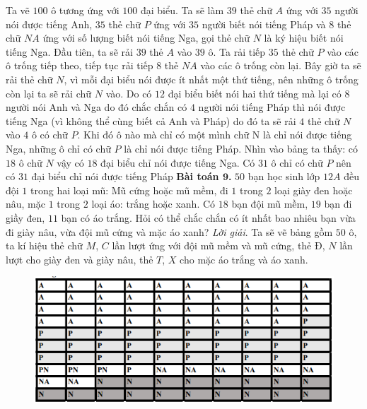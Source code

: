 \begin{multicols}{2}
\begin{figure}[H]
		\vspace*{-15pt}
	\end{figure}
	Ta vẽ $100$ ô tương ứng với $100$ đại biểu. Ta sẽ làm $39$ thẻ chữ $A$ ứng với $35$ người nói được tiếng Anh, $35$ thẻ chữ $P$ ứng với $35$ người biết nói tiếng Pháp và $8$ thẻ chữ $NA$ ứng với số lượng biết nói tiếng Nga, gọi thẻ chữ $N$ là ký hiệu biết nói tiếng Nga.
	\vskip 0.1cm
	Đầu tiên, ta sẽ rải $39$ thẻ $A$ vào $39$ ô. Ta rải tiếp $35$ thẻ chữ $P$ vào các ô trống tiếp theo, tiếp tục rải tiếp $8$ thẻ $NA$ vào các ô trống còn lại. Bây giờ ta sẽ rải thẻ chữ $N$, vì mỗi đại biểu nói được ít nhất một thứ tiếng, nên những ô trống còn lại ta sẽ rải chữ $N$ vào. Do có $12$ đại biểu biết nói hai thứ tiếng mà lại có $8$ người nói Anh và Nga do đó chắc chắn có $4$ người nói tiếng Pháp thì nói được tiếng Nga (vì không thể cùng biết cả Anh và Pháp) do đó ta sẽ rải $4$ thẻ chữ $N$ vào $4$ ô có chữ $P$. Khi đó ô nào mà chỉ có một mình chữ N là chỉ nói được tiếng Nga, những ô chỉ có chữ $P$ là chỉ nói được tiếng Pháp. Nhìn vào bảng ta thấy: có $18$ ô chữ $N$ vậy có $18$ đại biểu chỉ nói được tiếng Nga. Có $31$ ô chỉ có chữ $P$ nên có $31$ đại biểu chỉ nói được tiếng Pháp
	\vskip 0.1cm
	\textbf{\color{toancuabi}Bài toán $\pmb9$.}
	\vskip 0.1cm
	$50$ bạn học sinh lớp $12A$ đều đội $1$ trong hai loại mũ: Mũ cứng hoặc mũ mềm, đi $1$ trong $2$ loại giày đen hoặc nâu, mặc $1$ trong $2$ loại áo: trắng hoặc xanh. Có $18$ bạn đội mũ mềm, $19$ bạn đi giầy đen, $11$ bạn có áo trắng. Hỏi có thể chắc chắn có ít nhất bao nhiêu bạn vừa đi giày nâu, vừa đội mũ cứng và mặc áo xanh?
	\vskip 0.1cm
	\textit{Lời giải}.
	Ta sẽ vẽ bảng gồm $50$ ô, ta kí hiệu thẻ chữ $M$, $C$ lần lượt ứng với đội mũ mềm và mũ cứng, thẻ $Đ$, $N$ lần lượt cho giày đen và giày nâu, thẻ $T$, $X$ cho mặc áo trắng và áo xanh.
	\begin{figure}[H]
		\vspace*{-5pt}
		\centering
		\captionsetup{labelformat= empty, justification=centering}
		\includegraphics[width= 1\linewidth]{9}

\end{figure}
\end{multicols}
